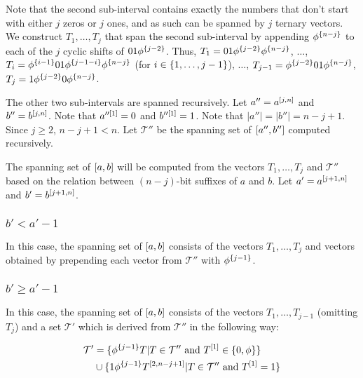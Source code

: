 Note that the second sub-interval contains exactly
the numbers that don't start with either $j$ zeros
or $j$ ones,
and as such can be spanned by $j$ ternary vectors.
We construct $T_1, \ldots, T_j$ that span
the second sub-interval
by appending $\phi^{\{n-j\}}$
to each of the $j$ cyclic shifts of $01 \phi^{\{j-2\}}$.
Thus,
$T_1 = 01 \phi^{\{j-2\}} \phi^{\{n-j\}}$,
$\ldots$,
$T_i = \phi^{\{i-1\}} 01 \phi^{\{j-1-i\}} \phi^{\{n-j\}}$
(for $i \in \{1, \ldots, j-1\}$),
$\ldots$,
$T_{j-1} = \phi^{\{j-2\}} 01 \phi^{\{n-j\}}$,
$T_j = 1 \phi^{\{j-2\}} 0 \phi^{\{n-j\}}$.

The other two sub-intervals are spanned recursively.
Let $a'' = a^{[j, n]}$ and $b'' = b^{[j, n]}$.
Note that $a''^{[1]} = 0$ and $b''^{[1]} = 1$.
Note that $|a''| = |b''| = n - j + 1$.
Since $j \geq 2$, $n-j+1 < n$.
Let $\mathcal{T}''$ be the spanning set
of $[a'', b'']$ computed recursively.

The spanning set of $[a, b]$ will be computed
from the vectors $T_1, \ldots, T_j$ and $\mathcal{T}''$
based on the relation between $(n-j)$-bit suffixes of $a$
and $b$.
Let $a' = a^{[j+1, n]}$ and $b' = b^{[j+1, n]}$.

\subsubsection{\texorpdfstring
{$b' < a' - 1$}
{b' < a' - 1}
}

In this case,
the spanning set of $[a, b]$ consists
of the vectors $T_1, \ldots, T_j$ and vectors obtained
by prepending each vector from $\mathcal{T}''$ with
$\phi^{\{j-1\}}$.

\subsubsection{\texorpdfstring
{$b' \geq a' - 1$}
{b' >= a' - 1}
}

In this case,
the spanning set of $[a, b]$ consists
of the vectors $T_1, \ldots, T_{j-1}$ (omitting $T_j$)
and a set $\mathcal{T}'$ which is derived
from $\mathcal{T}''$
in the following way:

\begin{align*}
\mathcal{T}' &= \{
\phi^{\{j-1\}} T | T \in \mathcal{T}'' \text{ and }
T^{[1]} \in \{0, \phi\}
\} \\
&\cup \{
1 \phi^{\{j-1\}} T^{[2, n-j+1]} | T \in \mathcal{T}''
\text{ and } T^{[1]} = 1
\}
\end{align*}


